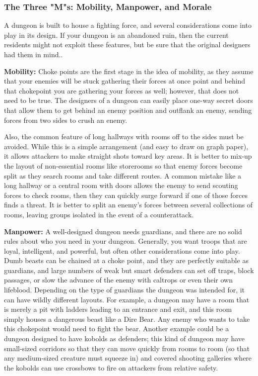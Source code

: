 \subsubsection{The Three "M"s: Mobility, Manpower, and Morale}

A dungeon is built to house a fighting force, and several considerations come into play in its design. If your dungeon is an abandoned ruin, then the current residents might not exploit these features, but be sure that the original designers had them in mind..

\textbf{Mobility:} Choke points are the first stage in the idea of mobility, as they assume that your enemies will be stuck gathering their forces at once point and behind that chokepoint you are gathering your forces as well; however, that does not need to be true. The designers of a dungeon can easily place one-way secret doors that allow them to get behind an enemy position and outflank an enemy, sending forces from two sides to crush an enemy.

Also, the common feature of long hallways with rooms off to the sides must be avoided. While this is a simple arrangement (and easy to draw on graph paper), it allows attackers to make straight shots toward key areas. It is better to mix-up the layout of non-essential rooms like storerooms so that enemy forces become split as they search rooms and take different routes. A common mistake like a long hallway or a central room with doors allows the enemy to send scouting forces to check rooms, then they can quickly surge forward if one of those forces finds a threat. It is better to split an enemy's forces between several collections of rooms, leaving groups isolated in the event of a counterattack.

\textbf{Manpower:} A well-designed dungeon needs guardians, and there are no solid rules about who you need in your dungeon. Generally, you want troops that are loyal, intelligent, and powerful, but often other considerations come into play. Dumb beasts can be chained at a choke point, and they are perfectly suitable as guardians, and large numbers of weak but smart defenders can set off traps, block passages, or slow the advance of the enemy with caltrops or even their own lifeblood. Depending on the type of guardians the dungeon was intended for, it can have wildly different layouts. For example, a dungeon may have a room that is merely a pit with ladders leading to an entrance and exit, and this room simply houses a dangerous beast like a Dire Bear. Any enemy who wants to take this chokepoint would need to fight the bear. Another example could be a dungeon designed to have kobolds as defenders; this kind of dungeon may have small-sized corridors so that they can move quickly from rooms to room (so that any medium-sized creature must squeeze in) and covered shooting galleries where the kobolds can use crossbows to fire on attackers from relative safety.


